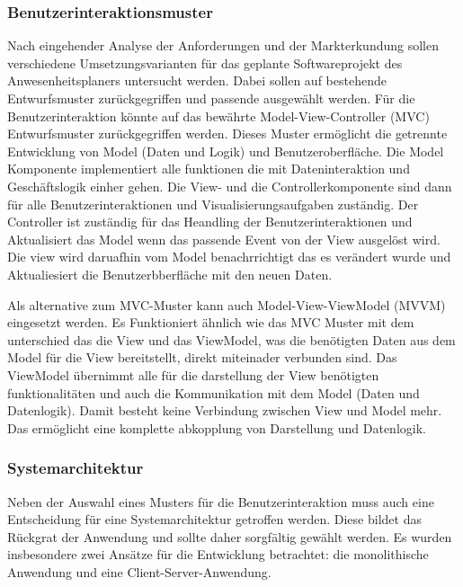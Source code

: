 \subsubsection{Benutzerinteraktionsmuster}
\label{sec:Benutzerinteraktionsmuster}
Nach eingehender Analyse der Anforderungen und der Markterkundung sollen verschiedene Umsetzungsvarianten für das geplante Softwareprojekt des Anwesenheitsplaners untersucht werden. Dabei sollen auf bestehende Entwurfsmuster zurückgegriffen und passende ausgewählt werden. Für die Benutzerinteraktion könnte auf das bewährte Model-View-Controller (MVC) Entwurfsmuster zurückgegriffen werden. Dieses Muster ermöglicht die getrennte Entwicklung von Model (Daten und Logik) und Benutzeroberfläche. Die Model Komponente implementiert alle funktionen die mit Dateninteraktion und Geschäftslogik einher gehen. Die View- und die Controllerkomponente sind dann für alle Benutzerinteraktionen und Visualisierungsaufgaben zuständig. Der Controller ist zuständig für das Heandling der Benutzerinteraktionen und Aktualisiert das Model wenn das passende Event von der View ausgelöst wird. Die view wird daruafhin vom Model benachrrichtigt das es verändert wurde und Aktualiesiert die Benutzerbberfläche mit den neuen Daten.%

Als alternative zum MVC-Muster kann auch Model-View-ViewModel (MVVM) eingesetzt werden. Es Funktioniert ähnlich wie das MVC Muster mit dem unterschied das die View und das ViewModel, was die benötigten Daten aus dem Model für die View bereitstellt, direkt miteinader verbunden sind. Das ViewModel übernimmt alle für die darstellung der View benötigten funktionalitäten und auch die Kommunikation mit dem Model (Daten und Datenlogik). Damit besteht keine Verbindung zwischen View und Model mehr. Das ermöglicht eine komplette abkopplung von Darstellung und Datenlogik. 

\subsubsection{Systemarchitektur}
\label{sec:Systemarchitektur}
Neben der Auswahl eines Musters für die Benutzerinteraktion muss auch eine Entscheidung für eine Systemarchitektur getroffen werden. Diese bildet das Rückgrat der Anwendung und sollte daher sorgfältig gewählt werden. Es wurden insbesondere zwei Ansätze für die Entwicklung betrachtet: die monolithische Anwendung und eine Client-Server-Anwendung.


